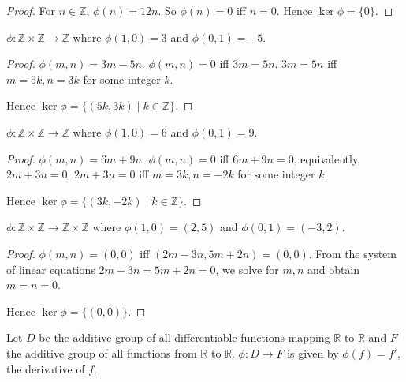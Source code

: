 \begin{proof}
    For $n\in\mathbb{Z}$, $\phi(n) = 12n$. So $\phi(n) = 0$ iff $n = 0$. Hence $\ker\phi = \{ 0 \}$.
\end{proof}

\newpage
\begin{exercise}
    $\phi: \mathbb{Z}\times\mathbb{Z} \to \mathbb{Z}$ where $\phi(1,0) = 3$ and $\phi(0,1) = -5$.
\end{exercise}

\begin{proof}
    $\phi(m, n) = 3m - 5n$. $\phi(m, n) = 0$ iff $3m = 5n$. $3m = 5n$ iff $m = 5k, n = 3k$ for some integer $k$.

    Hence $\ker\phi = \{ (5k, 3k) \mid k\in\mathbb{Z} \}$.
\end{proof}

\newpage
\begin{exercise}
    $\phi: \mathbb{Z}\times\mathbb{Z} \to \mathbb{Z}$ where $\phi(1,0) = 6$ and $\phi(0,1) = 9$.
\end{exercise}

\begin{proof}
    $\phi(m, n) = 6m + 9n$. $\phi(m, n) = 0$ iff $6m + 9n = 0$, equivalently, $2m + 3n = 0$. $2m + 3n = 0$ iff $m = 3k, n = -2k$ for some integer $k$.

    Hence $\ker\phi = \{ (3k, -2k) \mid k\in\mathbb{Z} \}$.
\end{proof}

\newpage
\begin{exercise}
    $\phi: \mathbb{Z}\times\mathbb{Z} \to \mathbb{Z}\times\mathbb{Z}$ where $\phi(1,0) = (2,5)$ and $\phi(0,1) = (-3,2)$.
\end{exercise}

\begin{proof}
    $\phi(m, n) = (0, 0)$ iff $(2m - 3n, 5m + 2n) = (0, 0)$. From the system of linear equations $2m - 3n = 5m + 2n = 0$, we solve for $m, n$ and obtain $m = n = 0$.

    Hence $\ker\phi = \{ (0,0) \}$.
\end{proof}

\newpage
\begin{exercise}
    Let $D$ be the additive group of all differentiable functions mapping $\mathbb{R}$ to $\mathbb{R}$ and $F$ the additive group of all functions from $\mathbb{R}$ to $\mathbb{R}$. $\phi: D \to F$ is given by $\phi(f) = f'$, the derivative of $f$.
\end{exercise}

